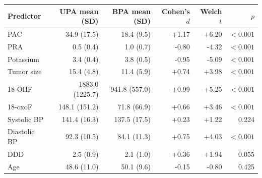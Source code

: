\begin{tabular}{lrrrrr}
\toprule
Predictor & UPA mean (SD) & BPA mean (SD) & Cohen's $d$ & Welch $t$ & $p$ \\
\midrule
PAC & 34.9 (17.5) & 18.4 (9.5) & +1.17 & +6.20 & $<0.001$ \\
PRA & 0.5 (0.4) & 1.0 (0.7) & -0.80 & -4.32 & $<0.001$ \\
Potassium & 3.4 (0.4) & 3.8 (0.5) & -0.95 & -5.09 & $<0.001$ \\
Tumor size & 15.4 (4.8) & 11.4 (5.9) & +0.74 & +3.98 & $<0.001$ \\
18-OHF & 1883.0 (1225.7) & 941.8 (557.0) & +0.99 & +5.25 & $<0.001$ \\
18-oxoF & 148.1 (151.2) & 71.8 (66.9) & +0.66 & +3.46 & $<0.001$ \\
Systolic BP & 141.4 (16.3) & 137.5 (17.5) & +0.23 & +1.22 & 0.224 \\
Diastolic BP & 92.3 (10.5) & 84.1 (11.3) & +0.75 & +4.03 & $<0.001$ \\
DDD & 2.5 (0.9) & 2.1 (1.0) & +0.36 & +1.94 & 0.055 \\
Age & 48.6 (11.0) & 50.1 (9.6) & -0.15 & -0.80 & 0.425 \\
\bottomrule
\end{tabular}
